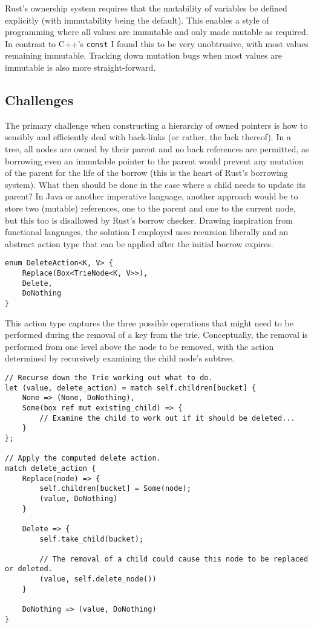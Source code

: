 \documentclass[a4paper,12pt]{article}
\newcommand{\code}[1]{\texttt{#1}}
\begin{document}
Rust's ownership system requires that the mutability of variables be defined explicitly (with immutability being the default). This enables a style of programming where all values are immutable and only made mutable as required. In contrast to C++'s \code{const} I found this to be very unobtrusive, with most values remaining immutable. Tracking down mutation bugs when most values are immutable is also more straight-forward.

\subsection{Challenges}

The primary challenge when constructing a hierarchy of owned pointers is how to sensibly and efficiently deal with back-links (or rather, the lack thereof). In a tree, all nodes are owned by their parent and no back references are permitted, as borrowing even an immutable pointer to the parent would prevent any mutation of the parent for the life of the borrow (this is the heart of Rust's borrowing system). What then should be done in the case where a child needs to update its parent? In Java or another imperative language, another approach would be to store two (mutable) references, one to the parent and one to the current node, but this too is disallowed by Rust's borrow checker. Drawing inspiration from functional languages, the solution I employed uses recursion liberally and an abstract action type that can be applied after the initial borrow expires.

\begin{verbatim}
enum DeleteAction<K, V> {
    Replace(Box<TrieNode<K, V>>),
    Delete,
    DoNothing
}
\end{verbatim}

This action type captures the three possible operations that might need to be performed during the removal of a key from the trie. Conceptually, the removal is performed from one level above the node to be removed, with the action determined by recursively examining the child node's subtree.

\begin{verbatim}
// Recurse down the Trie working out what to do.
let (value, delete_action) = match self.children[bucket] {
    None => (None, DoNothing),
    Some(box ref mut existing_child) => {
        // Examine the child to work out if it should be deleted...
    }
};

// Apply the computed delete action.
match delete_action {
    Replace(node) => {
        self.children[bucket] = Some(node);
        (value, DoNothing)
    }

    Delete => {
        self.take_child(bucket);

        // The removal of a child could cause this node to be replaced or deleted.
        (value, self.delete_node())
    }

    DoNothing => (value, DoNothing)
}
\end{verbatim}
\end{document}
